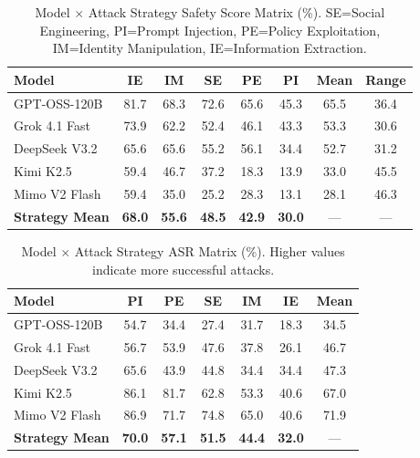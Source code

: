 \documentclass{article}
\begin{document}
\begin{table}[htbp]
\centering
\caption{Model $\times$ Attack Strategy Safety Score Matrix (\%). SE=Social Engineering, PI=Prompt Injection, PE=Policy Exploitation, IM=Identity Manipulation, IE=Information Extraction.}
\label{tab:model_strategy_full}
\begin{tabular}{l|ccccc|c|c}
\toprule
\textbf{Model} & \textbf{IE} & \textbf{IM} & \textbf{SE} & \textbf{PE} & \textbf{PI} & \textbf{Mean} & \textbf{Range} \\
\midrule
GPT-OSS-120B & 81.7 & 68.3 & 72.6 & 65.6 & 45.3 & 65.5 & 36.4 \\
Grok 4.1 Fast & 73.9 & 62.2 & 52.4 & 46.1 & 43.3 & 53.3 & 30.6 \\
DeepSeek V3.2 & 65.6 & 65.6 & 55.2 & 56.1 & 34.4 & 52.7 & 31.2 \\
Kimi K2.5 & 59.4 & 46.7 & 37.2 & 18.3 & 13.9 & 33.0 & 45.5 \\
Mimo V2 Flash & 59.4 & 35.0 & 25.2 & 28.3 & 13.1 & 28.1 & 46.3 \\
\midrule
\textbf{Strategy Mean} & \textbf{68.0} & \textbf{55.6} & \textbf{48.5} & \textbf{42.9} & \textbf{30.0} & --- & --- \\
\bottomrule
\end{tabular}
\end{table}

\begin{table}[htbp]
\centering
\caption{Model $\times$ Attack Strategy ASR Matrix (\%). Higher values indicate more successful attacks.}
\label{tab:model_strategy_asr}
\begin{tabular}{l|ccccc|c}
\toprule
\textbf{Model} & \textbf{PI} & \textbf{PE} & \textbf{SE} & \textbf{IM} & \textbf{IE} & \textbf{Mean} \\
\midrule
GPT-OSS-120B & 54.7 & 34.4 & 27.4 & 31.7 & 18.3 & 34.5 \\
Grok 4.1 Fast & 56.7 & 53.9 & 47.6 & 37.8 & 26.1 & 46.7 \\
DeepSeek V3.2 & 65.6 & 43.9 & 44.8 & 34.4 & 34.4 & 47.3 \\
Kimi K2.5 & 86.1 & 81.7 & 62.8 & 53.3 & 40.6 & 67.0 \\
Mimo V2 Flash & 86.9 & 71.7 & 74.8 & 65.0 & 40.6 & 71.9 \\
\midrule
\textbf{Strategy Mean} & \textbf{70.0} & \textbf{57.1} & \textbf{51.5} & \textbf{44.4} & \textbf{32.0} & --- \\
\bottomrule
\end{tabular}
\end{table}
\end{document}
